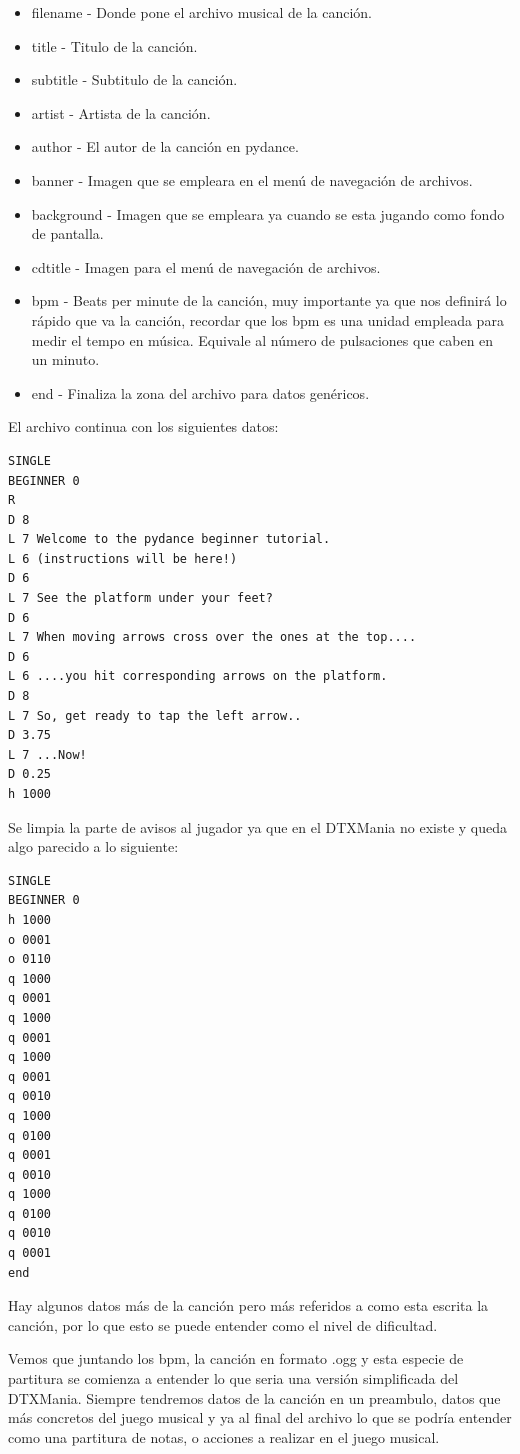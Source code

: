 \documentclass[a4paper,11pt,oneside]{book}
\begin{document}
\begin{itemize}
\item filename - Donde pone el archivo musical de la canción.
\item title - Titulo de la canción.
\item subtitle - Subtitulo de la canción.
\item artist - Artista de la canción.
\item author - El autor de la canción en pydance.
\item banner - Imagen que se empleara en el menú de navegación de archivos.
\item background - Imagen que se empleara ya cuando se esta jugando como fondo de pantalla.
\item cdtitle - Imagen para el menú de navegación de archivos.
\item bpm - Beats per minute de la canción, muy importante ya que nos definirá lo rápido que va la canción, recordar que los bpm es una unidad empleada para medir el tempo en música. Equivale al número de pulsaciones que caben en un minuto.
\item end - Finaliza la zona del archivo para datos genéricos.
\end{itemize}


El archivo continua con los siguientes datos:

\begin{Verbatim}[frame=single]
SINGLE
BEGINNER 0
R
D 8
L 7 Welcome to the pydance beginner tutorial.
L 6 (instructions will be here!)
D 6
L 7 See the platform under your feet?
D 6
L 7 When moving arrows cross over the ones at the top....
D 6
L 6 ....you hit corresponding arrows on the platform.
D 8
L 7 So, get ready to tap the left arrow..
D 3.75
L 7 ...Now!
D 0.25
h 1000
\end{Verbatim}


Se limpia la parte de avisos al jugador ya que en el DTXMania no existe y queda algo parecido a lo siguiente:

\begin{Verbatim}[frame=single]
SINGLE
BEGINNER 0
h 1000
o 0001
o 0110
q 1000
q 0001
q 1000
q 0001
q 1000
q 0001
q 0010
q 1000
q 0100
q 0001
q 0010
q 1000
q 0100
q 0010
q 0001
end
\end{Verbatim}

Hay algunos datos más de la canción pero más referidos a como esta escrita la canción, por lo que esto se puede entender como el nivel de dificultad.

Vemos que juntando los bpm, la canción en formato .ogg y esta especie de partitura se comienza a entender lo que seria una versión simplificada del DTXMania.
Siempre tendremos datos de la canción en un preambulo, datos que más concretos del juego musical y ya al final del archivo lo que se podría entender como una partitura de notas, o acciones a realizar en el juego musical.
\end{document}
